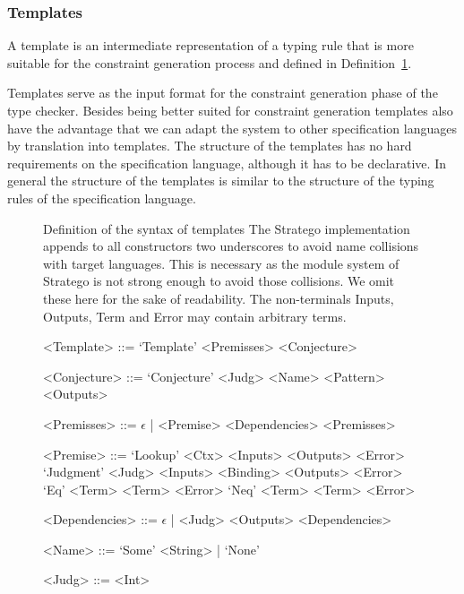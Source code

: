 \subsubsection{Templates}
A template is an intermediate representation of a typing rule that is
more suitable for the constraint generation process and defined in
Definition~\ref{def:template}.

Templates serve as the input format for the constraint generation
phase of the type checker. Besides being better suited for constraint
generation templates also have the advantage that we can adapt the
system to other specification languages by translation into
templates. The structure of the templates has no hard requirements on
the specification language, although it has to be declarative. In
general the structure of the templates is similar to the structure of
the typing rules of the specification language.

\begin{figure}
\begin{definition}{Definition of the syntax of templates}
   The Stratego implementation appends to all
  constructors two underscores to avoid name collisions with target
  languages. This is necessary as the module system of Stratego is not
  strong enough to avoid those collisions. We omit these here for the
  sake of readability. The non-terminals Inputs, Outputs, Term and
  Error may contain arbitrary terms.
  \begin{grammar}
    <Template> ::= `Template' <Premisses> <Conjecture>

    <Conjecture> ::= `Conjecture' <Judg> <Name> <Pattern> <Outputs>

    <Premisses> ::= $\epsilon$ | <Premise> <Dependencies> <Premisses>

    <Premise> ::= `Lookup' <Ctx> <Inputs> <Outputs> <Error>
    \alt `Judgment' <Judg> <Inputs> <Binding> <Outputs> <Error>
    \alt `Eq' <Term> <Term> <Error>
    \alt `Neq' <Term> <Term> <Error>

    <Dependencies> ::= $\epsilon$ | <Judg> <Outputs> <Dependencies>

    <Name> ::= `Some' <String> | `None'

    <Judg> ::= <Int>
  \end{grammar}
\label{def:template}
\end{definition}
\end{figure}


